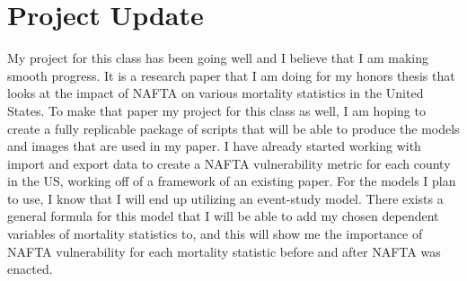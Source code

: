 \documentclass{article}
\begin{document}
\section{Project Update}
My project for this class has been going well and I believe that I am making smooth progress. It is a research paper that I am doing for my honors thesis that looks at the impact of NAFTA on various mortality statistics in the United States. To make that paper my project for this class as well, I am hoping to create a fully replicable package of scripts that will be able to produce the models and images that are used in my paper. I have already started working with import and export data to create a NAFTA vulnerability metric for each county in the US, working off of a framework of an existing paper. For the models I plan to use, I know that I will end up utilizing an event-study model. There exists a general formula for this model that I will be able to add my chosen dependent variables of mortality statistics to, and this will show me the importance of NAFTA vulnerability for each mortality statistic before and after NAFTA was enacted. 
\end{document}
